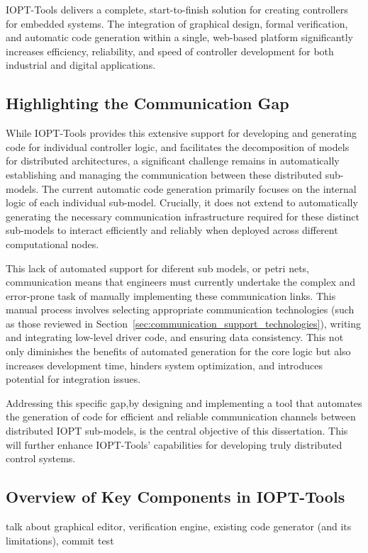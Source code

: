 IOPT-Tools delivers a complete, start-to-finish solution for creating controllers for embedded systems. The integration of graphical design, formal verification, and automatic code generation within a single, web-based platform significantly increases efficiency, reliability, and speed of controller development for both industrial and digital applications.


\subsection{Highlighting the Communication Gap}
\label{subsec:communication_gap}

While IOPT-Tools provides this extensive support for developing and generating code for individual controller logic, and facilitates the decomposition of models for distributed architectures, a significant challenge remains in automatically establishing and managing the communication between these distributed sub-models. The current automatic code generation primarily focuses on the internal logic of each individual sub-model. Crucially, it does not extend to automatically generating the necessary communication infrastructure required for these distinct sub-models to interact efficiently and reliably when deployed across different computational nodes.

This lack of automated support for diferent sub models, or petri nets, communication means that engineers must currently undertake the complex and error-prone task of manually implementing these communication links. This manual process involves selecting appropriate communication technologies (such as those reviewed in Section~\ref{sec:communication_support_technologies}), writing and integrating low-level driver code, and ensuring data consistency. This not only diminishes the benefits of automated generation for the core logic but also increases development time, hinders system optimization, and introduces potential for integration issues.

Addressing this specific gap,by designing and implementing a tool that automates the generation of code for efficient and reliable communication channels between distributed IOPT sub-models, is the central objective of this dissertation. This will further enhance IOPT-Tools' capabilities for developing truly distributed control systems.


\subsection{Overview of Key Components in IOPT-Tools}
\label{sub:iopt_tools_components}

talk about graphical editor, verification engine, existing code generator (and its limitations), commit test






